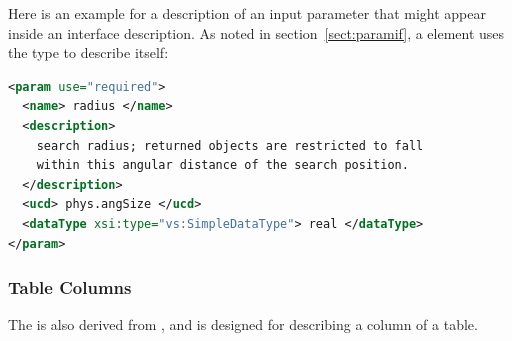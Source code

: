 \documentclass[11pt,a4paper]{ivoa}
\begin{document}


Here is an example for a description
of an input parameter that might appear inside an
 interface description.  As noted in
section~\ref{sect:paramif}, a 
element uses the  type to describe itself:

\begin{lstlisting}[language=XML]
<param use="required">
  <name> radius </name>
  <description>
    search radius; returned objects are restricted to fall 
    within this angular distance of the search position.
  </description>
  <ucd> phys.angSize </ucd>
  <dataType xsi:type="vs:SimpleDataType"> real </dataType>
</param>
\end{lstlisting}

\subsubsection{Table Columns}
\label{sect:columns}


The  is also derived from
, and is designed for describing a column of
a table.
\end{document}
